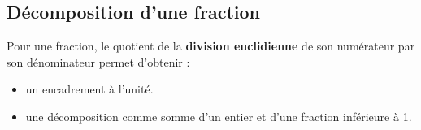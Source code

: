 \begin{changemargin}{0mm}{-15mm}
    \section{Décomposition d'une fraction}
    \begin{propriete}[\admise]
        Pour une fraction, le quotient de la \textbf{division euclidienne} de son numérateur par son dénominateur permet d'obtenir :
        \begin{itemize}
            \item un encadrement à l'unité.
            \item une décomposition comme somme d'un entier et d'une fraction inférieure à 1.
        \end{itemize}
    \end{propriete}
    

\end{changemargin}
